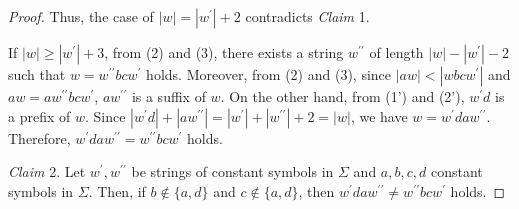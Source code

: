 \begin{proof}
  \smallskip

  \noindent
  Thus, the case of $|w|=|w^{\prime}|+2$ contradicts \textit{Claim} 1. 

  If $|w| \ge |w^{\prime}|+3$, from (2) and (3), there exists a string $w^{\prime\prime}$ of length $|w|-|w^{\prime}|-2$ such that $w=w^{\prime\prime}bcw^{\prime}$ holds.
  Moreover, from (2) and (3), since $|aw| < |wbcw^{\prime}|$ and $aw = aw^{\prime\prime}bcw^{\prime}$, $aw^{\prime\prime}$ is a suffix of $w$.
  On the other hand, from (1') and (2'), $w^{\prime}d$ is a prefix of $w$.
  Since $|w^{\prime}d| + |aw^{\prime\prime}| = |w^{\prime}| + |w^{\prime\prime}| + 2 = |w|$, we have $w=w^{\prime}daw^{\prime\prime}$.
  Therefore, $w^{\prime}daw^{\prime\prime} = w^{\prime\prime}bcw^{\prime}$ holds.
  
  \smallskip
  
  \noindent
  \textit{Claim} 2.
  Let $w^{\prime},w^{\prime\prime}$ be strings of constant symbols in $\Sigma$ and $a,b,c,d$ constant symbols in $\Sigma$.
  Then, if $b \not\in \{a,d\}$ and $c \not\in \{a,d\}$, then $w^{\prime}daw^{\prime\prime} \not = w^{\prime\prime}bcw^{\prime}$ holds.

  \smallskip
  

\end{proof}
